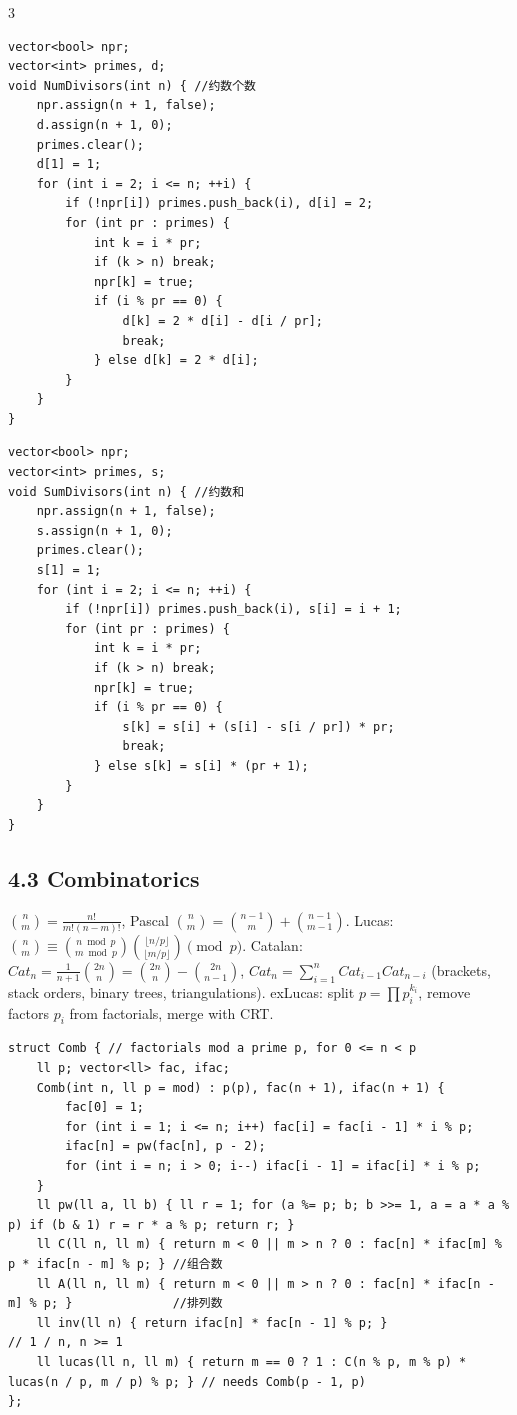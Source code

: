 \documentclass[8pt]{extarticle}
\begin{document}
\begin{multicols*}{3}
\begin{lstlisting}
vector<bool> npr;
vector<int> primes, d;
void NumDivisors(int n) { //约数个数
    npr.assign(n + 1, false);
    d.assign(n + 1, 0);
    primes.clear();
    d[1] = 1;
    for (int i = 2; i <= n; ++i) {
        if (!npr[i]) primes.push_back(i), d[i] = 2;
        for (int pr : primes) {
            int k = i * pr;
            if (k > n) break;
            npr[k] = true;
            if (i % pr == 0) { 
                d[k] = 2 * d[i] - d[i / pr];
                break; 
            } else d[k] = 2 * d[i];
        }
    }
}
\end{lstlisting}

\begin{lstlisting}
vector<bool> npr;
vector<int> primes, s;
void SumDivisors(int n) { //约数和
    npr.assign(n + 1, false);
    s.assign(n + 1, 0);
    primes.clear();
    s[1] = 1;
    for (int i = 2; i <= n; ++i) {
        if (!npr[i]) primes.push_back(i), s[i] = i + 1;
        for (int pr : primes) {
            int k = i * pr;
            if (k > n) break;
            npr[k] = true;
            if (i % pr == 0) {
                s[k] = s[i] + (s[i] - s[i / pr]) * pr;
                break;
            } else s[k] = s[i] * (pr + 1);
        }
    }
}
\end{lstlisting}

\subsection*{4.3 Combinatorics}

$\binom{n}{m} = \frac{n!}{m!(n-m)!}$, Pascal $\binom{n}{m} = \binom{n-1}{m} + \binom{n-1}{m-1}$. Lucas: $\binom{n}{m} \equiv \binom{n \bmod p}{m \bmod p}\binom{\lfloor n/p \rfloor}{\lfloor m/p \rfloor} \pmod p$.
Catalan: $Cat_n = \frac{1}{n+1}\binom{2n}{n} = \binom{2n}{n} - \binom{2n}{n-1}$, $Cat_n = \sum_{i=1}^{n} Cat_{i-1}Cat_{n-i}$ (brackets, stack orders, binary trees, triangulations).
exLucas: split $p = \prod p_i^{k_i}$, remove factors $p_i$ from factorials, merge with CRT.

\begin{lstlisting}
struct Comb { // factorials mod a prime p, for 0 <= n < p
    ll p; vector<ll> fac, ifac;
    Comb(int n, ll p = mod) : p(p), fac(n + 1), ifac(n + 1) {
        fac[0] = 1;
        for (int i = 1; i <= n; i++) fac[i] = fac[i - 1] * i % p;
        ifac[n] = pw(fac[n], p - 2);
        for (int i = n; i > 0; i--) ifac[i - 1] = ifac[i] * i % p;
    }
    ll pw(ll a, ll b) { ll r = 1; for (a %= p; b; b >>= 1, a = a * a % p) if (b & 1) r = r * a % p; return r; }
    ll C(ll n, ll m) { return m < 0 || m > n ? 0 : fac[n] * ifac[m] % p * ifac[n - m] % p; } //组合数
    ll A(ll n, ll m) { return m < 0 || m > n ? 0 : fac[n] * ifac[n - m] % p; }              //排列数
    ll inv(ll n) { return ifac[n] * fac[n - 1] % p; }                                      // 1 / n, n >= 1
    ll lucas(ll n, ll m) { return m == 0 ? 1 : C(n % p, m % p) * lucas(n / p, m / p) % p; } // needs Comb(p - 1, p)
};
\end{lstlisting}


\end{multicols*}
\end{document}
